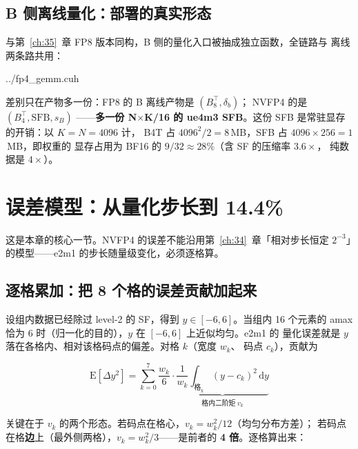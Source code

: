 \subsection{B 侧离线量化：部署的真实形态}

与第~\ref{ch:35}~章 FP8 版本同构，B 侧的量化入口被抽成独立函数，全链路与
离线两条路共用：

\begin{lstinputlisting}[linerange={367-393},firstnumber=auto,
  title={fp4\_gemm.cuh L367-393（B 量化入口：全链路与离线共用）}]{../fp4_gemm.cuh}
\end{lstinputlisting}

差别只在产物多一份：FP8 的 B 离线产物是 $(B_8^{\top}, \delta_b)$；
NVFP4 的是 $(B_4^{\top}, \mathrm{SFB}, s_B)$ ——\textbf{多一份 N$\times$K/16
的 ue4m3 SFB}。这份 SFB 是常驻显存的开销：以 $K{=}N{=}4096$ 计，
B4T 占 $4096^2/2 = 8$\,MB，SFB 占 $4096 \times 256 = 1$\,MB，即权重的
显存占用为 BF16 的 $9/32 \approx 28\%$（含 SF 的压缩率 $3.6\times$，
纯数据是 $4\times$）。

\section{误差模型：从量化步长到 14.4\%}\label{sec:36-err}

这是本章的核心一节。NVFP4 的误差不能沿用第~\ref{ch:34}~章「相对步长恒定
$2^{-3}$」的模型——e2m1 的步长随量级变化，必须逐格算。

\subsection{逐格累加：把 8 个格的误差贡献加起来}

设组内数据已经除过 level-2 的 SF，得到 $y \in [-6,6]$。当组内 16 个元素的
amax 恰为 $6$ 时（归一化的目的），$y$ 在 $[-6,6]$ 上近似均匀。e2m1 的
量化误差就是 $y$ 落在各格内、相对该格码点的偏差。对格 $k$（宽度 $w_k$、
码点 $c_k$），贡献为

\begin{equation}
  \mathrm{E}\!\left[\Delta y^2\right]
  = \sum_{k=0}^{7} \frac{w_k}{6}\cdot
    \underbrace{\frac{1}{w_k}\int_{\text{格}_k}(y-c_k)^2\,\mathrm{d}y}
              _{\text{格内二阶矩}\;v_k}
  \label{eq:36-grid}
\end{equation}

关键在于 $v_k$ 的两个形态。若码点在格心，$v_k = w_k^2/12$（均匀分布方差）；
若码点在格\textbf{边}上（最外侧两格），$v_k = w_k^2/3$——是前者的
\textbf{4 倍}。逐格算出来：

